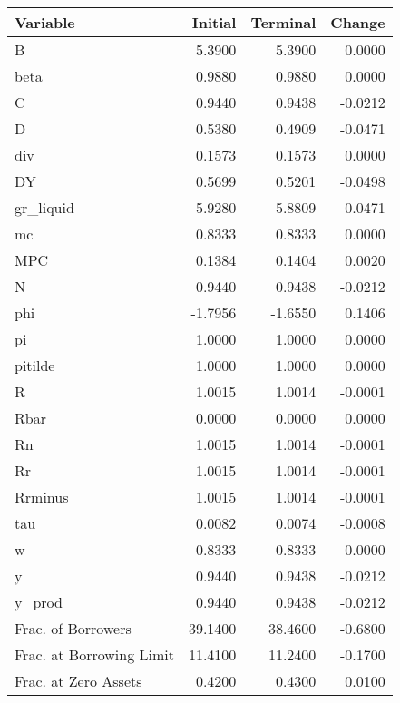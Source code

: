 \begin{table}
\centering
\label{tab:stst_comparison_end_L_limit_permanent}
\begin{tabular}{lrrr}
\toprule
                Variable &  Initial &  Terminal &  Change \\
\midrule
                       B &   5.3900 &    5.3900 &  0.0000 \\
                    beta &   0.9880 &    0.9880 &  0.0000 \\
                       C &   0.9440 &    0.9438 & -0.0212 \\
                       D &   0.5380 &    0.4909 & -0.0471 \\
                     div &   0.1573 &    0.1573 &  0.0000 \\
                      DY &   0.5699 &    0.5201 & -0.0498 \\
               gr\_liquid &   5.9280 &    5.8809 & -0.0471 \\
                      mc &   0.8333 &    0.8333 &  0.0000 \\
                     MPC &   0.1384 &    0.1404 &  0.0020 \\
                       N &   0.9440 &    0.9438 & -0.0212 \\
                     phi &  -1.7956 &   -1.6550 &  0.1406 \\
                      pi &   1.0000 &    1.0000 &  0.0000 \\
                 pitilde &   1.0000 &    1.0000 &  0.0000 \\
                       R &   1.0015 &    1.0014 & -0.0001 \\
                    Rbar &   0.0000 &    0.0000 &  0.0000 \\
                      Rn &   1.0015 &    1.0014 & -0.0001 \\
                      Rr &   1.0015 &    1.0014 & -0.0001 \\
                 Rrminus &   1.0015 &    1.0014 & -0.0001 \\
                     tau &   0.0082 &    0.0074 & -0.0008 \\
                       w &   0.8333 &    0.8333 &  0.0000 \\
                       y &   0.9440 &    0.9438 & -0.0212 \\
                  y\_prod &   0.9440 &    0.9438 & -0.0212 \\
      Frac. of Borrowers &  39.1400 &   38.4600 & -0.6800 \\
Frac. at Borrowing Limit &  11.4100 &   11.2400 & -0.1700 \\
    Frac. at Zero Assets &   0.4200 &    0.4300 &  0.0100 \\
\bottomrule
\end{tabular}
\end{table}
